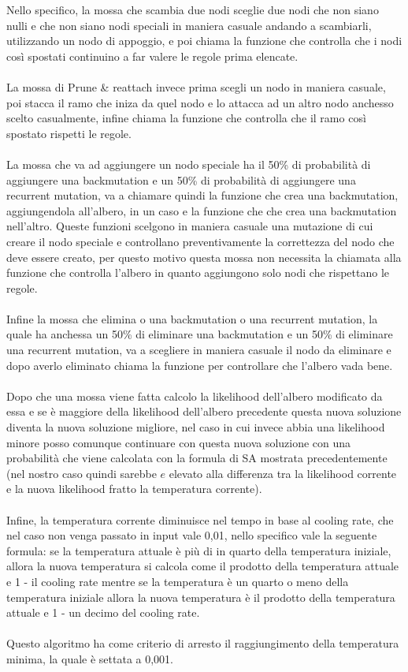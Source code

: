 \documentclass[12pt]{report}
\begin{document}
  Nello specifico, la mossa che scambia due nodi sceglie due nodi che non siano nulli e che non siano nodi speciali in maniera casuale andando a scambiarli, utilizzando un nodo di appoggio, e poi chiama la funzione che controlla che i nodi così spostati continuino a far valere le regole prima elencate.\\\\
  La mossa di Prune \& reattach invece prima scegli un nodo in maniera casuale, poi stacca il ramo che iniza da quel nodo e lo attacca ad un altro nodo anchesso scelto casualmente, infine chiama la funzione che controlla che il ramo così spostato rispetti le regole.\\\\
  La mossa che va ad aggiungere un nodo speciale ha il 50\% di probabilità di aggiungere una backmutation e un 50\% di probabilità di aggiungere una recurrent mutation, va a chiamare quindi la funzione che crea una backmutation, aggiungendola all'albero, in un caso e la funzione che che crea una backmutation nell'altro.
  Queste funzioni scelgono in maniera casuale una mutazione di cui creare il nodo speciale e controllano preventivamente la correttezza del nodo che deve essere creato, per questo motivo questa mossa non necessita la chiamata alla funzione che controlla l'albero in quanto aggiungono solo nodi che rispettano le regole.\\\\
  Infine la mossa che elimina o una backmutation o una recurrent mutation, la quale ha anchessa un 50\% di eliminare una backmutation e un 50\% di eliminare una recurrent mutation, va a scegliere in maniera casuale il nodo da eliminare e dopo averlo eliminato chiama la funzione per controllare che l'albero vada bene.\\\\
  Dopo che una mossa viene fatta calcolo la likelihood dell'albero modificato da essa e se è maggiore della likelihood dell'albero precedente questa nuova soluzione diventa la nuova soluzione migliore, nel caso in cui invece abbia una likelihood minore posso comunque continuare con questa nuova soluzione con una probabilità che viene calcolata con la formula di SA mostrata precedentemente (nel nostro caso quindi sarebbe $e$ elevato alla differenza tra la likelihood corrente e la nuova likelihood fratto la temperatura corrente).\\\\
  Infine, la temperatura corrente diminuisce nel tempo in base al cooling rate, che nel caso non venga passato in input vale 0,01, nello specifico vale la seguente formula: se la temperatura attuale è più di in quarto della temperatura iniziale, allora la nuova temperatura si calcola come il prodotto della temperatura attuale e 1 - il cooling rate mentre se la temperatura è un quarto o meno della temperatura iniziale allora la nuova temperatura è il prodotto della temperatura attuale e 1 - un decimo del cooling rate.\\\\
  Questo algoritmo ha come criterio di arresto il raggiungimento della temperatura minima, la quale è settata a 0,001.
\end{document}
